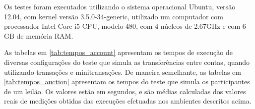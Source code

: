 \documentclass[11pt,twoside,a4paper]{book}
\begin{document}
Os testes foram executados utilizando o sistema operacional Ubuntu, versão 12.04, com kernel versão 3.5.0-34-generic, utilizado um computador com processador Intel\textregistered{} Core\texttrademark{} i5 CPU, modelo 480, com 4 núcleos de 2.67GHz e com 6 GB de memória RAM.

As tabelas em \ref{tab:tempos_account} apresentam os tempos de execução de diversas configurações do teste que simula as transferências entre contas, quando utilizando transações e minitransações. De maneira semelhante, as tabelas em  \ref{tab:tempos_auction} apresentam os tempos do teste que simula os participantes de um leilão. Os valores estão em segundos, e são médias calculadas dos valores reais de medições obtidas das execuções efetuadas nos ambientes descritos acima.




\end{document}
